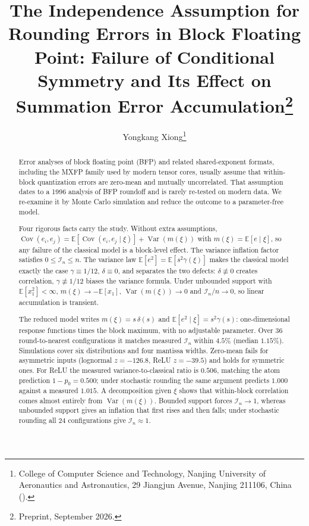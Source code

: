 \documentclass[twocolumn,review,hidelinks,oneeqnum,onetabnum,onefignum,onethmnum]{siamart251216}
\title{The Independence Assumption for Rounding Errors in Block Floating
Point: Failure of Conditional Symmetry and Its Effect on Summation Error
Accumulation\thanks{Preprint, September 2026.
\funding{The author received no external funding for this work.}}}
\author{Yongkang Xiong\thanks{College of Computer Science and Technology,
Nanjing University of Aeronautics and Astronautics, 29 Jiangjun Avenue,
Nanjing 211106, China (\email{nuaapanda@outlook.com}).}}
\begin{document}
\maketitle

\begin{abstract}
Error analyses of block floating point (BFP) and related shared-exponent formats,
including the MXFP family used by modern tensor cores, usually assume that
within-block quantization errors are zero-mean and mutually uncorrelated. That
assumption dates to a 1996 analysis of BFP roundoff and is rarely re-tested on
modern data. We re-examine it by Monte Carlo simulation and reduce the outcome to
a parameter-free model.

Four rigorous facts carry the study. Without extra assumptions,
$\operatorname{Cov}(e_i,e_j)=\mathbb{E}[\operatorname{Cov}(e_i,e_j\mid\xi)]
+\operatorname{Var}(m(\xi))$ with $m(\xi)=\mathbb{E}[e\mid\xi]$, so any failure of
the classical model is a block-level effect. The variance inflation factor
satisfies $0\le\mathcal I_n\le n$. The variance law
$\mathbb{E}[e^2]=\mathbb{E}[s^2\gamma(\xi)]$ makes the classical model exactly the
case $\gamma\equiv1/12$, $\delta\equiv0$, and separates the two defects:
$\delta\not\equiv0$ creates correlation, $\gamma\not\equiv1/12$ biases the
variance formula. Under unbounded support with $\mathbb{E}[x_1^2]<\infty$,
$m(\xi)\to-\mathbb{E}[x_1]$, $\operatorname{Var}(m(\xi))\to0$ and
$\mathcal I_n/n\to0$, so linear accumulation is transient.

The reduced model writes $m(\xi)=s\,\delta(s)$ and
$\mathbb{E}[e^2\mid\xi]=s^2\gamma(s)$: one-dimensional response functions times
the block maximum, with no adjustable parameter. Over 36 round-to-nearest
configurations it matches measured $\mathcal I_n$ within $4.5\%$ (median
$1.15\%$). Simulations cover six distributions and four mantissa widths. Zero-mean
fails for asymmetric inputs (lognormal $z=-126.8$, ReLU $z=-39.5$) and holds for
symmetric ones. For ReLU the measured variance-to-classical ratio is $0.506$,
matching the atom prediction $1-p_0=0.500$; under stochastic rounding the same
argument predicts $1.000$ against a measured $1.015$. A decomposition given $\xi$
shows that within-block correlation comes almost entirely from
$\operatorname{Var}(m(\xi))$. Bounded support forces $\mathcal I_n\to1$, whereas
unbounded support gives an inflation that first rises and then falls; under
stochastic rounding all $24$ configurations give $\mathcal I_n\approx1$.
\end{abstract}
\end{document}
